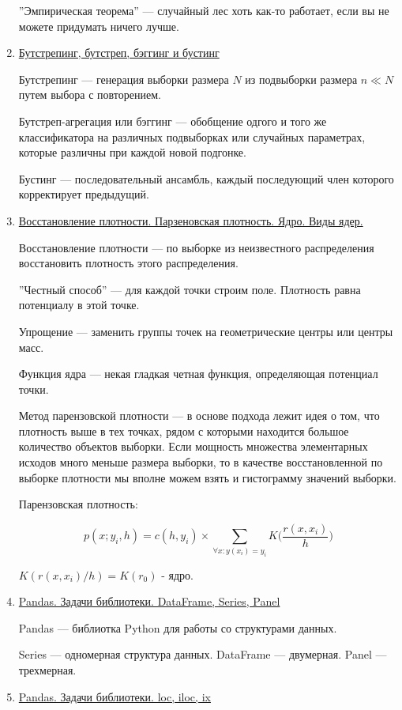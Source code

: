 \documentclass{proc}
\begin{document}
\begin{enumerate}
		''Эмпирическая теорема'' --- случайный лес хоть как-то работает, если вы не можете придумать ничего лучше.
		
		\item \uline{Бутстрепинг, бутстреп, бэггинг и бустинг}
		
		Бутстрепинг --- генерация выборки размера $N$ из подвыборки размера $n \ll N$ путем выбора с повторением.
		
		Бутстреп-агрегация или бэггинг --- обобщение одгого и того же классификатора на различных подвыборках или случайных параметрах, которые различны при каждой новой подгонке.
		
		Бустинг --- последовательный ансамбль, каждый последующий член которого корректирует предыдущий.
		
		\item \uline{Восстановление плотности. Парзеновская плотность. Ядро. Виды ядер.}
		
		Восстановление плотности --- по выборке из неизвестного распределения восстановить плотность этого распределения.
		
		''Честный способ'' --- для каждой точки строим поле. Плотность равна потенциалу в этой точке.
		
		Упрощение --- заменить группы точек на геометрические центры или центры масс.
		
		Функция ядра --- некая гладкая четная функция, определяющая потенциал точки.
		
		Метод парензовской плотности --- в основе подхода лежит идея о том, что плотность выше в тех точках, рядом с которыми находится большое количество объектов выборки. Если мощность множества элементарных исходов много меньше размера выборки, то в качестве восстановленной по выборке плотности мы вполне можем взять и гистограмму значений выборки.
		
		Парензовская плотность:
		
		$$p(x;y_i,h)=c(h,y_i) \times \sum_{\forall x:y(x_i)=y_i}^{ } K\bigg(\frac{r(x,x_i)}{h} \bigg)$$
		
		$K(r(x,x_i)/h) = K(r_0)$ - ядро.
		
		\item \uline{Pandas. Задачи библиотеки. DataFrame,  Series, Panel}
		
		Pandas --- библиотка Python для работы со структурами данных.
		
		Series --- одномерная структура данных.  DataFrame --- двумерная. Panel --- трехмерная.
		
		\item \uline{Pandas. Задачи библиотеки. loc, iloc, ix}
		

\end{enumerate}
\end{document}
